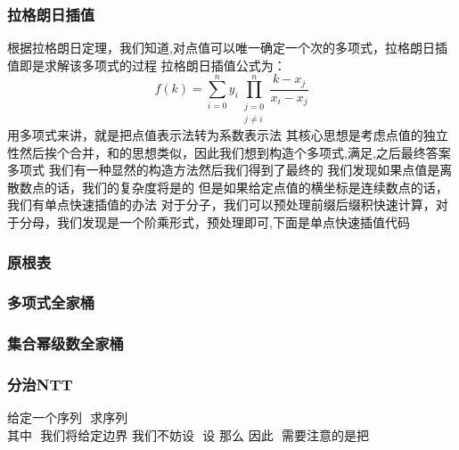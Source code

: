 \documentclass[8pt,a4paper]{article}
\newcommand{\code}[1]{
    
}
\newcommand{\txt}[1]{\par\noindent\footnotesize #1}
\newcommand{\inlineformula}[1]{\ensuremath{}}
\newcommand{\displayformula}[1]{%
    \vspace{0.2em}
    \[
        
    \]
}
\begin{document}
\begin{multicols}{2}
        \subsubsection{拉格朗日插值}
            \txt{根据拉格朗日定理，我们知道,\inlineformula{./assets/formulas_tex/formula_412.tex}对点值\inlineformula{./assets/formulas_tex/formula_413.tex}可以唯一确定一个\inlineformula{./assets/formulas_tex/formula_414.tex}次的多项式，拉格朗日插值即是求解该多项式的过程
拉格朗日插值公式为：
\[f(k)=\sum_{i=0}^{n} y_i \prod_{\substack{j=0\\ j\ne i}}^{n} \frac{k - x_j}{x_i - x_j}\]
用多项式来讲，就是把点值表示法转为系数表示法
其核心思想是考虑点值的独立性然后挨个合并，和\inlineformula{./assets/formulas_tex/formula_415.tex}的思想类似，因此我们想到构造\inlineformula{./assets/formulas_tex/formula_416.tex}个多项式\inlineformula{./assets/formulas_tex/formula_417.tex},满足\inlineformula{./assets/formulas_tex/formula_418.tex},之后最终答案多项式\inlineformula{./assets/formulas_tex/formula_419.tex}
我们有一种显然的构造方法\inlineformula{./assets/formulas_tex/formula_420.tex}然后我们得到了最终的\inlineformula{./assets/formulas_tex/formula_421.tex}
我们发现如果点值是离散数点的话，我们的复杂度将是\inlineformula{./assets/formulas_tex/formula_422.tex}的
但是如果给定点值的横坐标是连续数点的话，我们有单点快速插值的办法
对于分子，我们可以预处理前缀后缀积快速计算，对于分母，我们发现是一个阶乘形式，预处理即可,下面是单点快速插值代码}
            \code{src/number_theory/随机化算法_25.cpp}
        \subsubsection{原根表}
            \code{src/number_theory/随机化算法_2_5.cpp}
        \subsubsection{多项式全家桶}
            \code{src/number_theory/随机化算法_3_5.cpp}
        \subsubsection{集合幂级数全家桶}
            \code{src/number_theory/随机化算法_4_5.cpp}
        \subsubsection{分治NTT}
            \txt{给定一个序列 \inlineformula{./assets/formulas_tex/formula_423.tex} 求序列\displayformula{./assets/formulas_tex/formula_424.tex} 其中 \inlineformula{./assets/formulas_tex/formula_425.tex} 我们将给定边界\inlineformula{./assets/formulas_tex/formula_426.tex}
我们不妨设 \inlineformula{./assets/formulas_tex/formula_427.tex} 设\inlineformula{./assets/formulas_tex/formula_428.tex}
那么\inlineformula{./assets/formulas_tex/formula_429.tex}
因此 \inlineformula{./assets/formulas_tex/formula_430.tex} 需要注意的是把\displayformula{./assets/formulas_tex/formula_431.tex}}

\end{multicols}
\end{document}
